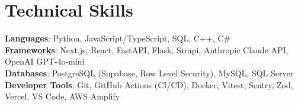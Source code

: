 \documentclass[letterpaper,11pt]{article}
\begin{document}
\section{Technical Skills}
 \begin{itemize}[leftmargin=0.15in, label={}]
    \small{\item{
     \textbf{Languages}{: Python, JavaScript/TypeScript, SQL, C++, C\#} \\
     \textbf{Frameworks}{: Next.js, React, FastAPI, Flask, Strapi, Anthropic Claude API, OpenAI GPT-4o-mini} \\
     \textbf{Databases}{: PostgreSQL (Supabase, Row Level Security), MySQL, SQL Server} \\
     \textbf{Developer Tools}{: Git, GitHub Actions (CI/CD), Docker, Vitest, Sentry, Zod, Vercel, VS Code, AWS Amplify}
    }}
 \end{itemize}


\end{document}
